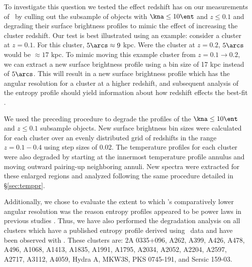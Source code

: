 \documentclass{emulateapj}
\begin{document}
To investigate this question we tested the effect redshift has on our
measurements of \kna\ by culling out the subsample of objects with
$\kna \leq 10 \ent$ and $z \leq 0.1$ and degrading their surface
brightness profiles to mimic the effect of increasing the cluster
redshift. Our test is best illustrated using an example: consider a
cluster at $z = 0.1$. For this cluster, $5\arcs \approx 9$ kpc. Were
the cluster at $z = 0.2$, $5\arcs$ would be $\approx 17$ kpc. To mimic
moving this example cluster from $z = 0.1 \rightarrow 0.2$, we can
extract a new surface brightness profile using a bin size of 17 kpc
instead of $5\arcs$. This will result in a new surface brightness
profile which has the angular resolution for a cluster at a higher
redshift, and subsequent analysis of the entropy profile should yield
information about how redshift effects the best-fit \kna.

We used the preceding procedure to degrade the profiles of the $\kna
\leq 10 \ent$ and $z \leq 0.1$ subsample objects. New surface
brightness bin sizes were calculated for each cluster over an evenly
distributed grid of redshifts in the range $z = 0.1-0.4$ using step
sizes of 0.02. The temperature profiles for each cluster were also
degraded by starting at the innermost temperature profile annulus and
moving outward pairing-up neighboring annuli. New spectra were
extracted for these enlarged regions and analyzed following the same
procedure detailed in \S\ref{sec:temppr}.

Additionally, we chose to evaluate the extent to which \xmm's
comparatively lower angular resolution was the reason entropy profiles
appeared to be power laws in previous studies \citep[see][for
  examples]{piffaretti05, pratt06}. Thus, we have also performed the
degradation analysis on all clusters which have a published entropy
profile derived using \xmm\ data and have been observed with
\chandra. These clusters are: 2A 0335+096, A262, A399, A426, A478,
A496, A1068, A1413, A1835, A1991, A1795, A2034, A2052, A2204, A2597,
A2717, A3112, A4059, Hydra A, MKW3S, PKS 0745-191, and Sersic 159-03.
\end{document}
